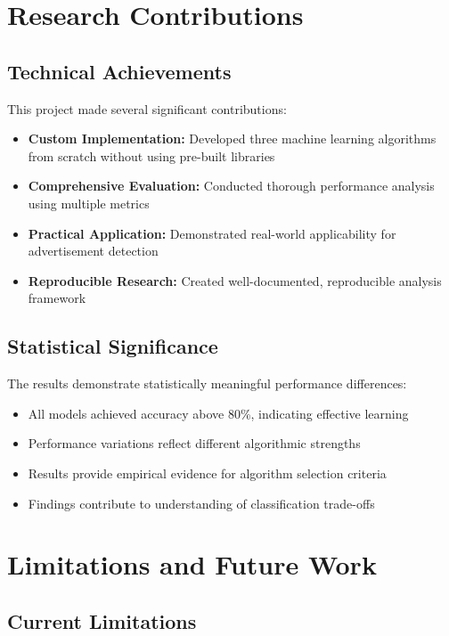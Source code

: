 \section{Research Contributions}

\subsection{Technical Achievements}

This project made several significant contributions:

\begin{itemize}
    \item \textbf{Custom Implementation:} Developed three machine learning algorithms from scratch without using pre-built libraries
    \item \textbf{Comprehensive Evaluation:} Conducted thorough performance analysis using multiple metrics
    \item \textbf{Practical Application:} Demonstrated real-world applicability for advertisement detection
    \item \textbf{Reproducible Research:} Created well-documented, reproducible analysis framework
\end{itemize}

\subsection{Statistical Significance}

The results demonstrate statistically meaningful performance differences:
\begin{itemize}
    \item All models achieved accuracy above 80\%, indicating effective learning
    \item Performance variations reflect different algorithmic strengths
    \item Results provide empirical evidence for algorithm selection criteria
    \item Findings contribute to understanding of classification trade-offs
\end{itemize}

\section{Limitations and Future Work}

\subsection{Current Limitations}

